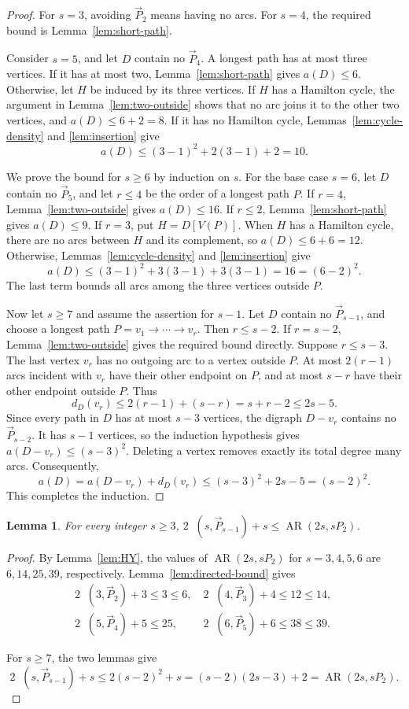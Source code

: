 \documentclass[12pt]{article}
\newtheorem{lemma}[theorem]{Lemma}
\DeclareMathOperator{\AR}{AR}
\DeclareMathOperator{\exdir}{ex_{dir}}
\newcommand{\dP}{\overrightarrow{P}}
\begin{document}
\begin{proof}
For $s=3$, avoiding $\dP_2$ means having no arcs. For $s=4$, the required
bound is Lemma~\ref{lem:short-path}.

Consider $s=5$, and let $D$ contain no $\dP_4$. A longest path has at most
three vertices. If it has at most two, Lemma~\ref{lem:short-path} gives
$a(D)\le6$. Otherwise, let $H$ be induced by its three vertices. If $H$
has a Hamilton cycle, the argument in Lemma~\ref{lem:two-outside} shows
that no arc joins it to the other two vertices, and $a(D)\le6+2=8$.
If it has no Hamilton cycle, Lemmas~\ref{lem:cycle-density} and
\ref{lem:insertion} give
\[
 a(D)\le(3-1)^2+2(3-1)+2=10.
\]

We prove the bound for $s\ge6$ by induction on $s$.
For the base case $s=6$, let $D$ contain no $\dP_5$, and let $r\le4$ be
the order of a longest path $P$. If $r=4$, Lemma~\ref{lem:two-outside}
gives $a(D)\le16$. If $r\le2$, Lemma~\ref{lem:short-path} gives
$a(D)\le9$. If $r=3$, put $H=D[V(P)]$. When $H$ has a Hamilton cycle,
there are no arcs between $H$ and its complement, so $a(D)\le6+6=12$.
Otherwise, Lemmas~\ref{lem:cycle-density} and \ref{lem:insertion} give
\[
 a(D)\le(3-1)^2+3(3-1)+3(3-1)=16=(6-2)^2.
\]
The last term bounds all arcs among the three vertices outside $P$.

Now let $s\ge7$ and assume the assertion for $s-1$. Let $D$ contain no
$\dP_{s-1}$, and choose a longest path $P=v_1\to\cdots\to v_r$.
Then $r\le s-2$. If $r=s-2$, Lemma~\ref{lem:two-outside} gives the
required bound directly. Suppose $r\le s-3$. The last vertex $v_r$ has
no outgoing arc to a vertex outside $P$. At most $2(r-1)$ arcs incident
with $v_r$ have their other endpoint on $P$, and at most $s-r$ have their
other endpoint outside $P$. Thus
\[
 d_D(v_r)\le2(r-1)+(s-r)=s+r-2\le2s-5.
\]
Since every path in $D$ has at most $s-3$ vertices, the digraph $D-v_r$
contains no $\dP_{s-2}$. It has $s-1$ vertices, so the induction hypothesis
gives $a(D-v_r)\le(s-3)^2$. Deleting a vertex removes exactly its total
degree many arcs. Consequently,
\[
 a(D)=a(D-v_r)+d_D(v_r)
 \le(s-3)^2+2s-5=(s-2)^2.
\]
This completes the induction.
\end{proof}
\begin{lemma}\label{lem:comparison}
For every integer $s\ge3$, $2\exdir(s,\dP_{s-1})+s\le \AR(2s,sP_2)$.
\end{lemma}
\begin{proof}
By Lemma~\ref{lem:HY}, the values of $\AR(2s,sP_2)$ for $s=3,4,5,6$ are
$6,14,25,39$, respectively. Lemma~\ref{lem:directed-bound} gives
\begin{align*}
& 2\exdir(3,\dP_{2})+3\le3\le6,\quad
2\exdir(4,\dP_{3})+4\le12\le14,\quad\\
&2\exdir(5,\dP_{4})+5\le25,\quad\quad\,\,
2\exdir(6,\dP_{5})+6\le38\le39.	
\end{align*}

For $s\ge7$, the two lemmas give
\[
 2\exdir(s,\dP_{s-1})+s\le2(s-2)^2+s
 =(s-2)(2s-3)+2=\AR(2s,sP_2).
\]
\end{proof}
\end{document}
